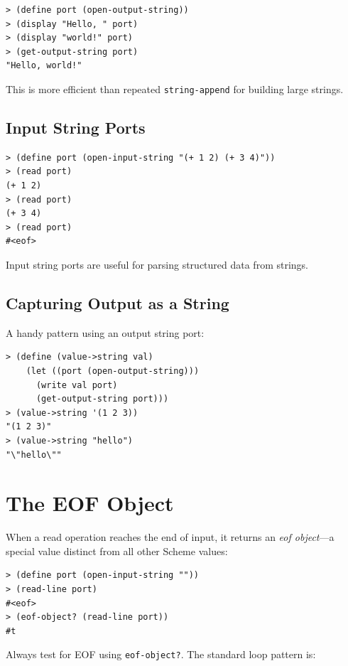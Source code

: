 \begin{lstlisting}[style=repl]
> (define port (open-output-string))
> (display "Hello, " port)
> (display "world!" port)
> (get-output-string port)
"Hello, world!"
\end{lstlisting}

This is more efficient than repeated \texttt{string-append} for building large strings.

\subsection{Input String Ports}

\begin{lstlisting}[style=repl]
> (define port (open-input-string "(+ 1 2) (+ 3 4)"))
> (read port)
(+ 1 2)
> (read port)
(+ 3 4)
> (read port)
#<eof>
\end{lstlisting}

Input string ports are useful for parsing structured data from strings.

\subsection{Capturing Output as a String}

A handy pattern using an output string port:

\begin{lstlisting}[style=repl]
> (define (value->string val)
    (let ((port (open-output-string)))
      (write val port)
      (get-output-string port)))
> (value->string '(1 2 3))
"(1 2 3)"
> (value->string "hello")
"\"hello\""
\end{lstlisting}

\section{The EOF Object}

When a read operation reaches the end of input, it returns an \emph{eof object}---a special value distinct from all other Scheme values:

\begin{lstlisting}[style=repl]
> (define port (open-input-string ""))
> (read-line port)
#<eof>
> (eof-object? (read-line port))
#t
\end{lstlisting}

Always test for EOF using \texttt{eof-object?}. The standard loop pattern is:

